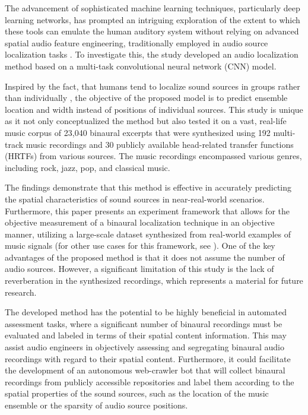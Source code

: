 \documentclass{article}
\begin{document}
The advancement of sophisticated machine learning techniques, particularly deep learning networks, has prompted an intriguing exploration of the extent to which these tools can emulate the human auditory system without relying on advanced spatial audio feature engineering, traditionally employed in audio source localization tasks \cite{yang_deepear_2022, vera-diaz_towards_2018, pang_multitask_2019}. To investigate this, the study developed an audio localization method based on a multi-task convolutional neural network (CNN) model.

Inspired by the fact, that humans tend to localize sound sources in groups rather than individually \cite{bregman_auditory_1990, rumsey_spatial_2002}, the objective of the proposed model is to predict ensemble location and width instead of positions of individual sources. This study is unique as it not only conceptualized the method but also tested it on a vast, real-life music corpus of 23,040 binaural excerpts that were synthesized using 192 multi-track music recordings and 30 publicly available head-related transfer functions (HRTFs) from various sources. The music recordings encompassed various genres, including rock, jazz, pop, and classical music.

The findings demonstrate that this method is effective in accurately predicting the spatial characteristics of sound sources in near-real-world scenarios. Furthermore, this paper presents an experiment framework that allows for the objective measurement of a binaural localization technique in an objective manner, utilizing a large-scale dataset synthesized from real-world examples of music signals (for other use cases for this framework, see \cite{antoniuk2023blind, zielinski_automatic_2022, zielinski_spatial_2022, zielinski_comparison_2020}). One of the key advantages of the proposed method is that it does not assume the number of audio sources. However, a significant limitation of this study is the lack of reverberation in the synthesized recordings, which represents a material for future research.

The developed method has the potential to be highly beneficial in automated assessment tasks, where a significant number of binaural recordings must be evaluated and labeled in terms of their spatial content information. This may assist audio engineers in objectively assessing and segregating binaural audio recordings with regard to their spatial content. Furthermore, it could facilitate the development of an autonomous web-crawler bot that will collect binaural recordings from publicly accessible repositories and label them according to the spatial properties of the sound sources, such as the location of the music ensemble or the sparsity of audio source positions.
\end{document}
